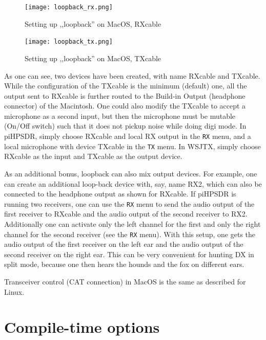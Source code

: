 \documentclass[12pt]{book}
\def\bltt#1{\texttt{\color{blue}#1}}
\def\pH{pi\-HPSDR\xspace}
\begin{document}
\begin{figure}[ht!]
\center
\texttt{[image: loopback\_rx.png]}
\caption{Setting up ,,loopback'' on MacOS, RXcable}
\label{fig:loopback_rx}
\end{figure}

\begin{figure}[ht!]
\center
\texttt{[image: loopback\_tx.png]}
\caption{Setting up ,,loopback'' on MacOS, TXcable}
\label{fig:loopback_tx}
\end{figure}

As one can see, two devices have been created, with name RXcable and TXcable.
While the configuration of the TXcable is the minimum (default) one, all the
output sent to RXcable is further routed to the Build-in Output (headphone
connector) of the Macintosh. One could also modify the TXcable to accept a
microphone as a second input, but then the microphone must be mutable
(On/Off switch) such that it does not pickup noise while doing digi mode.
In \pH, simply choose RXcable and local RX output in the \bltt{RX} menu,
and a local microphone with device TXcable in the \bltt{TX} menu. In WSJTX,
simply choose RXcable as the input and TXcable as the output device.

As an additional bonus, loopback can also mix output devices. For example, one can create
an additional loop-back device with, say, name RX2, which can also be connected to
the headphone output as shown for RXcable. If \pH is running two receivers,
one can use the \bltt{RX} menu to send the audio output of the first receiver to RXcable
and the audio output of the second receiver to RX2. Additionally one can activate only
the left channel for the first and only the right channel for the second receiver
(see the \bltt{RX} menu). With this setup,
one gets the audio output of the first receiver on the left ear and the audio output of
the second receiver on the right ear. This can be very convenient for hunting DX in split mode,
because one then hears the hounds and the fox on different ears.

Transceiver control (CAT connection) in MacOS is the same as described for Linux.

\chapter{Compile-time options}
\label{sec:compiletime}
\end{document}
